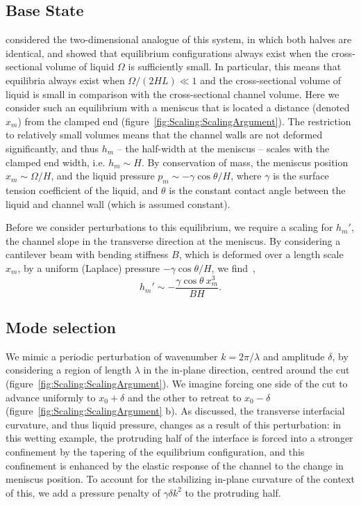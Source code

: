 \documentclass{jfm}
\newcommand{\amplitude}{\delta} %
\begin{document}
\subsection{Base State}
\citet{Taroni2012JFM} considered the two-dimensional analogue of this system, in which both halves are identical, and showed that equilibrium configurations always exist when the cross-sectional volume of liquid $\Omega$ is sufficiently small. In particular, this means that equilibria always exist when $\Omega / (2HL) \ll 1$ and the cross-sectional volume of liquid is small in comparison with the cross-sectional channel volume. Here we consider such an equilibrium with a meniscus that is located a distance (denoted $x_m$) from the clamped end (figure~\ref{fig:Scaling:ScalingArgument}). The restriction to relatively small volumes means that the channel walls are not deformed significantly, and thus $h_m$ -- the half-width at the meniscus -- scales with the clamped end width, i.e. $h_m \sim H$. By conservation of mass, the meniscus position $x_m \sim \Omega / H$, and the liquid pressure $p_m \sim -\gamma \cos \theta/H$, where $\gamma$ is the surface tension coefficient of the liquid, and $\theta$ is the constant contact angle between the liquid and channel wall (which is assumed constant).

Before we consider perturbations to this equilibrium, we require a scaling for $h_m'$, the channel slope in the transverse direction at the meniscus. By considering a cantilever beam with bending stiffness $B$, which is deformed over a length scale $x_m$, by a uniform (Laplace) pressure $-\gamma \cos \theta / H$, we find~\citep{Timoshenko1959},
\begin{equation}\label{E:Scaling:hmprimed}
h_m' \sim -\frac{\gamma \cos \theta \ x_m^3}{B H}.
\end{equation}

\subsection{Mode selection}
We mimic a periodic perturbation of wavenumber $k = 2\pi/\lambda$ and amplitude $\amplitude$, by considering a region of length $\lambda$ in the in-plane direction, centred around the cut (figure~\ref{fig:Scaling:ScalingArgument}). We imagine forcing one side of the cut to advance uniformly to $x_0 + \amplitude$ and the other to retreat to $x_0 - \amplitude$ (figure~\ref{fig:Scaling:ScalingArgument} b). As discussed, the transverse interfacial curvature, and thus liquid pressure, changes as a result of this perturbation: in this wetting example, the protruding half of the interface is forced into a stronger confinement by the tapering of the equilibrium configuration, and this confinement is enhanced by the elastic response of the channel to the change in meniscus position. To account for the stabilizing in-plane curvature of the context of this, we add a pressure penalty of $\gamma \delta k^2$ to the protruding half.
\end{document}
